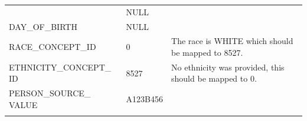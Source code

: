 \documentclass[11pt]{book}
\theoremstyle{definition}
\theoremstyle{definition}
\theoremstyle{definition}
\theoremstyle{remark}
\begin{document}
\begin{longtable}[]{@{}lll@{}}
\begin{minipage}[t]{0.23\columnwidth}
\end{minipage} & \begin{minipage}[t]{0.16\columnwidth}\raggedright\strut
NULL\strut
\end{minipage} & \begin{minipage}[t]{0.32\columnwidth}\raggedright\strut
\strut
\end{minipage}\tabularnewline
\begin{minipage}[t]{0.23\columnwidth}\raggedright\strut
DAY\_OF\_BIRTH\strut
\end{minipage} & \begin{minipage}[t]{0.16\columnwidth}\raggedright\strut
NULL\strut
\end{minipage} & \begin{minipage}[t]{0.32\columnwidth}\raggedright\strut
\strut
\end{minipage}\tabularnewline
\begin{minipage}[t]{0.23\columnwidth}\raggedright\strut
RACE\_CONCEPT\_ID\strut
\end{minipage} & \begin{minipage}[t]{0.16\columnwidth}\raggedright\strut
0\strut
\end{minipage} & \begin{minipage}[t]{0.32\columnwidth}\raggedright\strut
The race is WHITE which should be mapped to 8527.\strut
\end{minipage}\tabularnewline
\begin{minipage}[t]{0.23\columnwidth}\raggedright\strut
ETHNICITY\_CONCEPT\_ ID\strut
\end{minipage} & \begin{minipage}[t]{0.16\columnwidth}\raggedright\strut
8527\strut
\end{minipage} & \begin{minipage}[t]{0.32\columnwidth}\raggedright\strut
No ethnicity was provided, this should be mapped to 0.\strut
\end{minipage}\tabularnewline
\begin{minipage}[t]{0.23\columnwidth}\raggedright\strut
PERSON\_SOURCE\_ VALUE\strut
\end{minipage} & \begin{minipage}[t]{0.16\columnwidth}\raggedright\strut
A123B456\strut
\end{minipage} & \begin{minipage}[t]{0.32\columnwidth}\raggedright\strut
\strut
\end{minipage}\tabularnewline
\begin{minipage}[t]{0.23\columnwidth}\raggedright\strut

\end{minipage}
\end{longtable}
\end{document}
